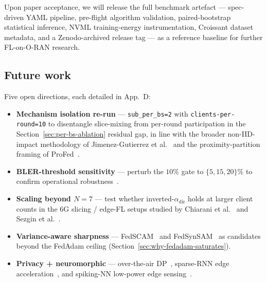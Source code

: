 \documentclass[journal]{IEEEtran}
\newcommand{\alphadir}{\ensuremath{\alpha_{\mathrm{dir}}}}
\begin{document}
Upon paper acceptance, we will release the full benchmark artefact --- spec-driven YAML pipeline, pre-flight algorithm validation, paired-bootstrap statistical inference, NVML training-energy instrumentation, Croissant dataset metadata, and a Zenodo-archived release tag --- as a reference baseline for further FL-on-O-RAN research.

\subsection{Future work}

Five open directions, each detailed in App.~D:

\begin{itemize}
  \item \textbf{Mechanism isolation re-run} --- \lstinline|sub_per_bs=2| with \lstinline|clients-per-round=10| to disentangle slice-mixing from per-round participation in the Section~\ref{sec:per-bs-ablation} residual gap, in line with the broader non-IID-impact methodology of Jimenez-Gutierrez et al.~\cite{JimenezGutierrez2025_NonIID} and the proximity-partition framing of ProFed~\cite{ProFed2025}.
  \item \textbf{BLER-threshold sensitivity} --- perturb the $10\%$ gate to $\{5, 15, 20\}\%$ to confirm operational robustness~\cite{arXiv2504_16185}.
  \item \textbf{Scaling beyond $N = 7$} --- test whether inverted-$\alphadir$ holds at larger client counts in the 6G slicing / edge-FL setups studied by Chiarani et al.~\cite{Chiarani2025} and Sezgin et al.~\cite{Sezgin2025}.
  \item \textbf{Variance-aware sharpness} --- FedSCAM~\cite{FedSCAM2026} and FedSynSAM~\cite{FedSynSAM2026} as candidates beyond the FedAdam ceiling (Section~\ref{sec:why-fedadam-saturates}).
  \item \textbf{Privacy + neuromorphic} --- over-the-air DP~\cite{arXiv2510_23463}, sparse-RNN edge acceleration~\cite{arXiv2502_01330}, and spiking-NN low-power edge sensing~\cite{arXiv2604_27004}.
\end{itemize}




\end{document}
